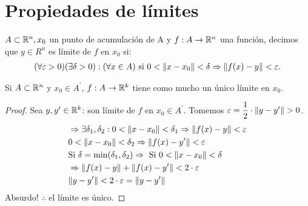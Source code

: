 \section{Propiedades de límites}

\begin{definition}[Límite]
  \(A \subset \mathbb{R}^n, x_0\) un punto de acumulación de A y \(f: A \to \mathbb{R}^n\) una función, decimos que \(y \in R^n\) es límite de \(f\) en \(x_0\) si: \begin{align*}
    (\forall \varepsilon > 0)(\exists \delta>0) : (\forall x \in A) \text{ si } 0 < \|x - x_0\| < \delta \Rightarrow \|f(x) - y\| < \varepsilon.
  \end{align*}
\end{definition}

\begin{lemma}
  Si \(A \subset \mathbb{R}^n\) y \(x_0 \in A^{\prime} \), \(f: A \to \mathbb{R}^k\) tiene como mucho un único límite en \(x_0\).
  \begin{proof}
    Sea \(y, y^{\prime} \in \mathbb{R}^k \): son límite de \(f\) en \(x_0 \in A^{\prime} \). Tomemos \(\varepsilon = \dfrac{1}{2} \cdot \|y - y^{\prime}\| > 0\).\begin{align*}
       & \Rightarrow \exists \delta_1, \delta_2 : 0 < \| x - x_0 \| < \delta_1 \Rightarrow \|f(x) - y \| < \varepsilon \\
       & 0 < \|x - x_0\| < \delta_2 \Rightarrow \|f(x) - y^{\prime}\| < \varepsilon                                    \\
       & \text{Si } \delta = \min(\delta_1, \delta_2) \Rightarrow \text{ Si } 0 < \|x - x_0\| < \delta        \\
       & \Rightarrow \|f(x) - y\| + \|f(x) - y^{\prime}\| < 2 \cdot \varepsilon                                        \\
       & \|y - y^{\prime}\| < 2 \cdot \varepsilon = \|y - y^{\prime}\|
    \end{align*}
    Absurdo! \(\therefore \) el límite es único.
  \end{proof}
\end{lemma}

